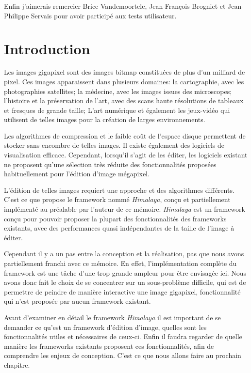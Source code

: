 	Enfin j'aimerais remercier Brice Vandemoortele, Jean-François Brogniet et Jean-Philippe Servais pour avoir participé aux tests utilisateur.

\chapter{Introduction}
	Les images gigapixel sont des images bitmap constituées de plus d'un milliard de pixel. Ces images apparaissent dans plusieurs domaines: la cartographie,
	avec les photographies satellites; la médecine, avec les images issues des microscopes; l'histoire et la préservation de l'art, avec des scans haute 
	résolutions de tableaux et fresques de grande taille; L'art numérique et également les jeux-vidéo qui utilisent de telles images pour la création
	de larges environnements. 

	Les algorithmes de compression et le faible coût de l'espace disque permettent de stocker sans encombre de telles images. Il existe également des logiciels
	de visualisation efficace. Cependant, lorsqu'il s'agit de les éditer, les logiciels existant ne proposent qu'une sélection très réduite des fonctionnalités
	proposées habituellement pour l'édition d'image mégapixel.  

	L'édition de telles images requiert une approche et des algorithmes différents. C'est ce que propose le framework nommé \emph{Himalaya}, conçu et
	partiellement implémenté au préalable par l'auteur de ce mémoire.  \emph{Himalaya} est un framework conçu pour pouvoir proposer la plupart des
	fonctionnalités des frameworks existants, avec des performances quasi indépendantes de la taille de l'image à éditer. 

	Cependant il y a un pas entre la conception et la réalisation, pas que nous avons partiellement franchi avec ce mémoire. En effet, l'implémentation
	complète du framework est une tâche d'une trop grande ampleur pour être envisagée ici. Nous avons donc fait le choix de se concentrer sur un
	sous-problème difficile, qui est de permettre de peindre de manière interactive une image gigapixel, fonctionnalité qui n'est proposée par aucun
	framework existant.

	Avant d'examiner en détail le framework \emph{Himalaya} il est important de se demander ce qu'est un framework d'édition d'image, quelles sont les
	fonctionnalités utiles et nécessaires de ceux-ci. Enfin il faudra regarder de quelle manière les frameworks existants proposent ces fonctionnalités,
	afin de comprendre les enjeux de conception. C'est ce que nous allons faire au prochain chapitre. 
	
